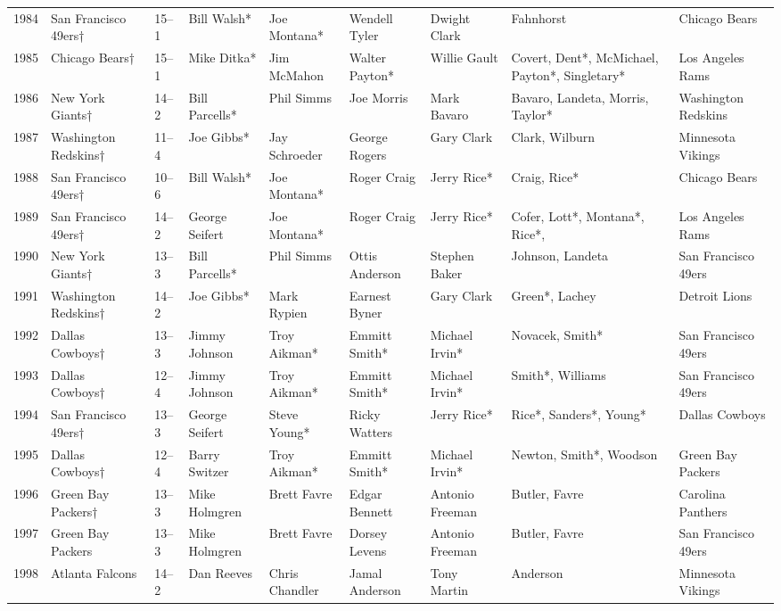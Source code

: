 \documentclass{article}
\begin{document}
\begin{tabular}{lllllllll}
1984 & San Francisco 49ers† & 15–1 & Bill Walsh* & Joe Montana* & Wendell Tyler & Dwight Clark & Fahnhorst & Chicago Bears \\
1985 & Chicago Bears† & 15–1 & Mike Ditka* & Jim McMahon & Walter Payton* & Willie Gault & Covert, Dent*, McMichael, Payton*, Singletary* & Los Angeles Rams \\
1986 & New York Giants† & 14–2 & Bill Parcells* & Phil Simms & Joe Morris & Mark Bavaro & Bavaro, Landeta, Morris, Taylor* & Washington Redskins \\
1987 & Washington Redskins† & 11–4 & Joe Gibbs* & Jay Schroeder & George Rogers & Gary Clark & Clark, Wilburn & Minnesota Vikings \\
1988 & San Francisco 49ers† & 10–6 & Bill Walsh* & Joe Montana* & Roger Craig & Jerry Rice* & Craig, Rice* & Chicago Bears \\
1989 & San Francisco 49ers† & 14–2 & George Seifert & Joe Montana* & Roger Craig & Jerry Rice* & Cofer, Lott*, Montana*, Rice*, & Los Angeles Rams \\
1990 & New York Giants† & 13–3 & Bill Parcells* & Phil Simms & Ottis Anderson & Stephen Baker & Johnson, Landeta & San Francisco 49ers \\
1991 & Washington Redskins† & 14–2 & Joe Gibbs* & Mark Rypien & Earnest Byner & Gary Clark & Green*, Lachey & Detroit Lions \\
1992 & Dallas Cowboys† & 13–3 & Jimmy Johnson & Troy Aikman* & Emmitt Smith* & Michael Irvin* & Novacek, Smith* & San Francisco 49ers \\
1993 & Dallas Cowboys† & 12–4 & Jimmy Johnson & Troy Aikman* & Emmitt Smith* & Michael Irvin* & Smith*, Williams & San Francisco 49ers \\
1994 & San Francisco 49ers† & 13–3 & George Seifert & Steve Young* & Ricky Watters & Jerry Rice* & Rice*, Sanders*, Young* & Dallas Cowboys \\
1995 & Dallas Cowboys† & 12–4 & Barry Switzer & Troy Aikman* & Emmitt Smith* & Michael Irvin* & Newton, Smith*, Woodson & Green Bay Packers \\
1996 & Green Bay Packers† & 13–3 & Mike Holmgren & Brett Favre & Edgar Bennett & Antonio Freeman & Butler, Favre & Carolina Panthers \\
1997 & Green Bay Packers & 13–3 & Mike Holmgren & Brett Favre & Dorsey Levens & Antonio Freeman & Butler, Favre & San Francisco 49ers \\
1998 & Atlanta Falcons & 14–2 & Dan Reeves & Chris Chandler & Jamal Anderson & Tony Martin & Anderson & Minnesota Vikings \\

\end{tabular}
\end{document}
